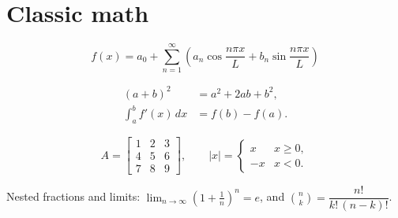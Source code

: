 \documentclass[11pt]{article}
\begin{document}
\section*{Classic math}

\begin{equation}
  f(x) = a_0 + \sum_{n=1}^{\infty}\left(a_n\cos\frac{n\pi x}{L}
         + b_n\sin\frac{n\pi x}{L}\right)
\end{equation}

\begin{align}
  (a+b)^2 &= a^2 + 2ab + b^2, \\
  \int_a^b f'(x)\,dx &= f(b) - f(a).
\end{align}

\[
  A = \begin{bmatrix} 1 & 2 & 3 \\ 4 & 5 & 6 \\ 7 & 8 & 9 \end{bmatrix},
  \qquad
  |x| = \begin{cases} x & x \ge 0, \\ -x & x < 0. \end{cases}
\]

Nested fractions and limits: $\displaystyle\lim_{n\to\infty}
\left(1+\frac{1}{n}\right)^{n} = e$, and
$\binom{n}{k} = \dfrac{n!}{k!\,(n-k)!}$.
\end{document}
